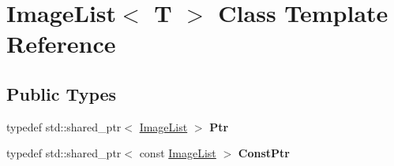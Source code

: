\hypertarget{classImageList}{}\section{Image\+List$<$ T $>$ Class Template Reference}
\label{classImageList}
\subsection*{Public Types}
\begin{DoxyCompactItemize}
\item 
typedef std\+::shared\+\_\+ptr$<$ \hyperlink{classImageList}{Image\+List} $>$ {\bfseries Ptr}\hypertarget{classImageList_a569597bdb53c7c387f93043494f981b5}{}\label{classImageList_a569597bdb53c7c387f93043494f981b5}

\item 
typedef std\+::shared\+\_\+ptr$<$ const \hyperlink{classImageList}{Image\+List} $>$ {\bfseries Const\+Ptr}\hypertarget{classImageList_a700bb19db02b13cb4ccd12603b3b5ad8}{}\label{classImageList_a700bb19db02b13cb4ccd12603b3b5ad8}

\end{DoxyCompactItemize}
